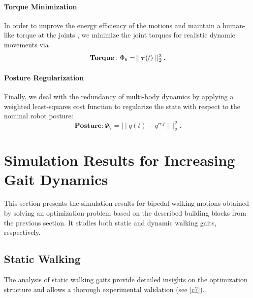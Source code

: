 \paragraph{Torque Minimization}
In order to improve the energy efficiency of the motions and maintain a human-like torque at the joints \cite{kim1994modeling}, we minimize the joint torques for realistic dynamic movements via
\begin{equation*} 
\textbf{Torque}: \Phi_6=\mid\mid \bm{\mathit{\tau}}(t)\mid\mid^2_2.
\end{equation*}
\paragraph{Posture Regularization}
Finally, we deal with the redundancy of multi-body dynamics by applying a weighted least-squares cost function to regularize the state with respect to the nominal robot posture:
\begin{equation*} 
\textbf{Posture}: \Phi_7=\mid\mid q(t)-q^{ref}\mid\mid^2_2.
\end{equation*}


\section{Simulation Results for Increasing Gait Dynamics}\label{sec:BipedSimulation}
This section presents the simulation results for bipedal walking motions obtained by solving an optimization problem based on the described building blocks from the previous section. It studies both static and dynamic walking gaits, respectively.

\subsection{Static Walking}
The analysis of static walking gaits provide detailed insights on the optimization structure and allows a thorough experimental validation (see \cref{c7}).

